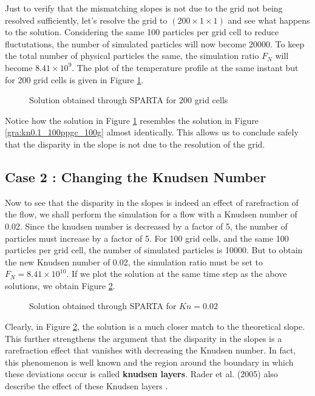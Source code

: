 Just to verify that the mismatching slopes is not due to the grid not being resolved sufficiently, let's resolve the grid to $(200 \times 1 \times 1)$ and see what happens to the solution. Considering the same 100 particles per grid cell to reduce fluctutations, the number of simulated particles will now become 20000. To keep the total number of physical particles the same, the simulation ratio $F_N$ will become $8.41 \times 10^9$. The plot of the temperature profile at the same instant but for 200 grid cells is given in Figure \ref{gra:kn0.1_100ppgc_200g}.

\begin{figure}[H]
	\centering
    
    \caption{Solution obtained through SPARTA for 200 grid cells}
	\label{gra:kn0.1_100ppgc_200g}
\end{figure}

\no Notice how the solution in Figure \ref{gra:kn0.1_100ppgc_200g} resembles the solution in Figure \ref{gra:kn0.1_100ppgc_100g} almost identically. This allows us to conclude safely that the disparity in the slope is not due to the resolution of the grid.

\subsection{Case 2 : Changing the Knudsen Number}

Now to see that the disparity in the slopes is indeed an effect of rarefraction of the flow, we shall perform the simulation for a flow with a Knudsen number of 0.02. Since the knudsen number is decreased by a factor of 5, the number of particles must increase by a factor of 5. For 100 grid cells, and the same 100 particles per grid cell, the number of simulated particles is 10000. But to obtain the new Knudsen number of 0.02, the simulation ratio must be set to $F_N = 8.41 \times 10^{10}$. If we plot the solution at the same time step as the above solutions, we obtain Figure \ref{gra:kn0.1_100ppgc_kn_0.02}.

\begin{figure}[H]
	\centering
    
    \caption{Solution obtained through SPARTA for $Kn = 0.02$}
	\label{gra:kn0.1_100ppgc_kn_0.02}
\end{figure}

\no Clearly, in Figure \ref{gra:kn0.1_100ppgc_kn_0.02}, the solution is a much closer match to the theoretical slope. This further strengthens the argument that the disparity in the slopes is a rarefraction effect that vanishes with decreasing the Knudsen number. In fact, this phenomenon is well known and the region around the boundary in which these deviations occur is called \textbf{knudsen layers}. Rader et al. (2005) also describe the effect of these Knudsen layers \cite{article}.